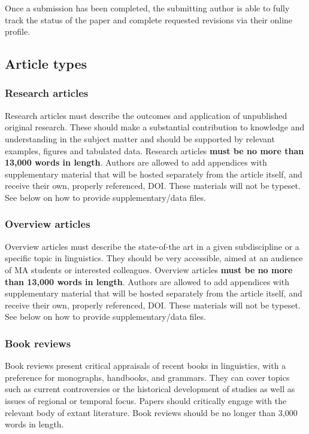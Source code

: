 \documentclass[charis,linguex,biblatex]{glossa}
\begin{document}
Once a submission has been completed, the submitting author is able to fully track the status of the paper and complete requested revisions via their online profile.

\subsection{Article types}

\subsubsection{Research articles}

Research articles must describe the outcomes and application of unpublished original research. These should make a substantial contribution to knowledge and understanding in the subject matter and should be supported by relevant examples, figures and tabulated data. Research articles \textbf{must be no more than 13,000 words in length}. Authors are allowed to add appendices with supplementary material that will be hosted separately from the article itself, and receive their own, properly referenced, DOI. These materials will not be typeset. See below on how to provide supplementary/data files.

\subsubsection{Overview articles}

Overview articles must describe the state-of-the art in a given subdiscipline or a specific topic in linguistics. They should be very accessible, aimed at an audience of MA students or interested colleagues. Overview articles \textbf{must be no more than 13,000 words in length}. Authors are allowed to add appendices with supplementary material that will be hosted separately from the article itself, and receive their own, properly referenced, DOI. These materials will not be typeset.  See below on how to provide supplementary/data files.

\subsubsection{Book reviews}

Book reviews present critical appraisals of recent books in linguistics, with a preference for monographs, handbooks, and grammars. They can cover topics such as current controversies or the historical development of studies as well as issues of regional or temporal focus. Papers should critically engage with the relevant body of extant literature. Book reviews should be no longer than 3,000 words in length.
\end{document}
